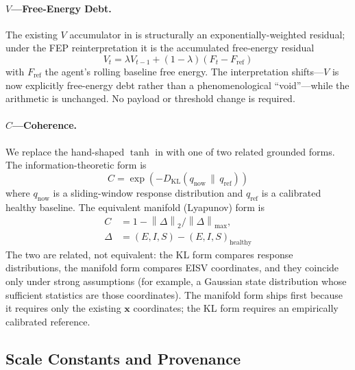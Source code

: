 \documentclass[11pt,twocolumn]{article}
\newcommand{\norm}[1]{\left\lVert #1 \right\rVert}
\newcommand{\eisv}{\ensuremath{\mathbf{x}}}
\begin{document}
\paragraph{$V$---Free-Energy Debt.}
The existing $V$ accumulator in  is structurally an
exponentially-weighted residual; under the FEP reinterpretation it is
the accumulated free-energy residual
\begin{equation}
  V_t = \lambda V_{t-1} + (1-\lambda)(F_t - F_{\text{ref}})
  \label{eq:V-grounded}
\end{equation}
with $F_{\text{ref}}$ the agent's rolling baseline free energy.
The interpretation shifts---$V$ is now explicitly free-energy debt
rather than a phenomenological ``void''---while the arithmetic is
unchanged. No payload or threshold change is required.

\paragraph{$C$---Coherence.}
We replace the hand-shaped $\tanh$ in  with one of
two related grounded forms. The information-theoretic form is
\begin{equation}
  C = \exp\!\left(-D_{\mathrm{KL}}(q_{\text{now}} \,\|\, q_{\text{ref}})\right)
  \label{eq:C-KL}
\end{equation}
where $q_{\text{now}}$ is a sliding-window response distribution and
$q_{\text{ref}}$ is a calibrated healthy baseline. The equivalent
manifold (Lyapunov) form is
\begin{align}
  C &= 1 - \norm{\Delta}_2 / \norm{\Delta}_{\max}, \nonumber \\
  \Delta &= (E, I, S) - (E, I, S)_{\text{healthy}}
  \label{eq:C-manifold}
\end{align}
The two are related, not equivalent: the KL form compares response
distributions, the manifold form compares EISV coordinates, and they
coincide only under strong assumptions (for example, a Gaussian
state distribution whose sufficient statistics are those
coordinates). The manifold form
ships first because it requires only the existing $\eisv$
coordinates; the KL form requires an empirically calibrated
reference.

\subsection{Scale Constants and Provenance}
\label{sec:scale-constants}
\end{document}
